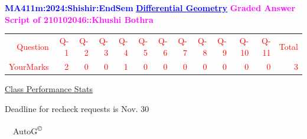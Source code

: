 \documentclass{article}                              %
\begin{document}
%
\vspace*{1in}

\begin{center}
	\textbf{\textcolor{blue}{\LARGE MA411m:2024:Shishir:EndSem}}
	\vskip 1cm
	\textbf{\textcolor{blue}{\underline{\Large Differential Geometry}}}
	\vskip 1cm
	\textbf{\textcolor{magenta}{\LARGE Graded Answer Script of 210102046::Khushi Bothra}}
\end{center}


\begin{center}
	\Huge 
	\textcolor{red}{
	\begin{tabular}{*{13}{r}}
		Question&Q-1& Q-2& Q-3& Q-4& Q-5& Q-6& Q-7& Q-8& Q-9& Q-10& Q-11&Total  \\
        	YourMarks&2&0&0&1&0&0&0&0&0&0&0&3
	\end{tabular}
	}
        \vskip 2cm
	\large
	\underline{Class Performance Stats}
	\DTLsetseparator{;}
	\begin{table}[htbp]
		\centering
	\end{table}
	\vskip 1cm
	Deadline for recheck requests is Nov. 30
\end{center}
\ \vfill \ \hfill \small AutoG\textsuperscript{\copyright}
\newpage
%
\end{document}
